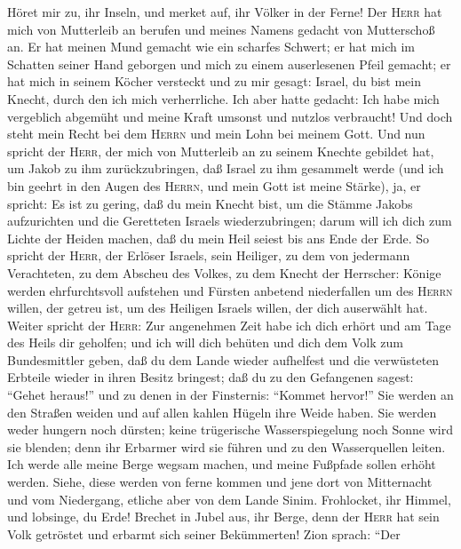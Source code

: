 Höret mir zu, ihr Inseln, und merket auf, ihr Völker in
der Ferne! Der \textsc{Herr} hat mich von Mutterleib an berufen und
meines Namens gedacht von Mutterschoß an.  Er hat meinen
Mund gemacht wie ein scharfes Schwert; er hat mich im Schatten seiner
Hand geborgen und mich zu einem auserlesenen Pfeil gemacht; er hat mich
in seinem Köcher versteckt  und zu mir gesagt: Israel, du
bist mein Knecht, durch den ich mich verherrliche.  Ich
aber hatte gedacht: Ich habe mich vergeblich abgemüht und meine Kraft
umsonst und nutzlos verbraucht! Und doch steht mein Recht bei dem
\textsc{Herrn} und mein Lohn bei meinem Gott.  Und nun
spricht der \textsc{Herr}, der mich von Mutterleib an zu seinem Knechte
gebildet hat, um Jakob zu ihm zurückzubringen, daß Israel zu ihm
gesammelt werde (und ich bin geehrt in den Augen des \textsc{Herrn}, und
mein Gott ist meine Stärke),  ja, er spricht: Es ist zu
gering, daß du mein Knecht bist, um die Stämme Jakobs aufzurichten und
die Geretteten Israels wiederzubringen; darum will ich dich zum Lichte
der Heiden machen, daß du mein Heil seiest bis ans Ende der Erde.
 So spricht der \textsc{Herr}, der Erlöser Israels, sein
Heiliger, zu dem von jedermann Verachteten, zu dem Abscheu des Volkes,
zu dem Knecht der Herrscher: Könige werden ehrfurchtsvoll aufstehen und
Fürsten anbetend niederfallen um des \textsc{Herrn} willen, der getreu
ist, um des Heiligen Israels willen, der dich auserwählt hat.
 Weiter spricht der \textsc{Herr}: Zur angenehmen Zeit
habe ich dich erhört und am Tage des Heils dir geholfen; und ich will
dich behüten und dich dem Volk zum Bundesmittler geben, daß du dem Lande
wieder aufhelfest und die verwüsteten Erbteile wieder in ihren Besitz
bringest;  daß du zu den Gefangenen sagest: ``Gehet
heraus!'' und zu denen in der Finsternis: ``Kommet hervor!'' Sie werden
an den Straßen weiden und auf allen kahlen Hügeln ihre Weide haben.
 Sie werden weder hungern noch dürsten; keine trügerische
Wasserspiegelung noch Sonne wird sie blenden; denn ihr Erbarmer wird sie
führen und zu den Wasserquellen leiten.  Ich werde alle
meine Berge wegsam machen, und meine Fußpfade sollen erhöht werden.
 Siehe, diese werden von ferne kommen und jene dort von
Mitternacht und vom Niedergang, etliche aber von dem Lande Sinim.
 Frohlocket, ihr Himmel, und lobsinge, du Erde! Brechet
in Jubel aus, ihr Berge, denn der \textsc{Herr} hat sein Volk getröstet
und erbarmt sich seiner Bekümmerten!  Zion sprach: ``Der
